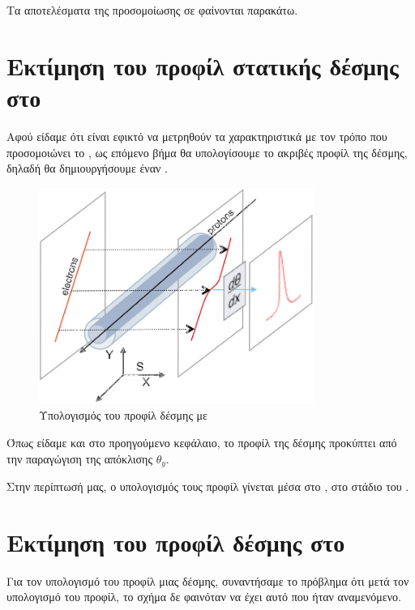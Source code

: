 Τα αποτελέσματα της προσομοίωσης σε φαίνονται παρακάτω. 


\section{Εκτίμηση του προφίλ στατικής δέσμης στο }

Αφού είδαμε ότι είναι εφικτό να μετρηθούν τα χαρακτηριστικά με τον τρόπο που προσομοιώνει το , ως επόμενο βήμα θα υπολογίσουμε το ακριβές προφίλ της δέσμης, δηλαδή θα δημιουργήσουμε έναν .

\begin{figure}[tph]
\includegraphics[width=0.8\textwidth]{figures/EBS-profile-calculation}
\centering
\caption{Υπολογισμός του προφίλ δέσμης με }
\label{fig:EBS-profile-calculation}
\end{figure}

Όπως είδαμε και στο προηγούμενο κεφάλαιο, το προφίλ της δέσμης προκύπτει από την παραγώγιση  της απόκλισης $\theta_y$.

Στην περίπτωσή μας, ο υπολογισμός τους προφίλ γίνεται μέσα στο , στο στάδιο του .



\section{Εκτίμηση του προφίλ  δέσμης στο }

Για τον υπολογισμό του προφίλ μιας  δέσμης, συναντήσαμε το πρόβλημα ότι μετά τον υπολογισμό του προφίλ, το σχήμα δε φαινόταν να έχει αυτό που ήταν αναμενόμενο.

